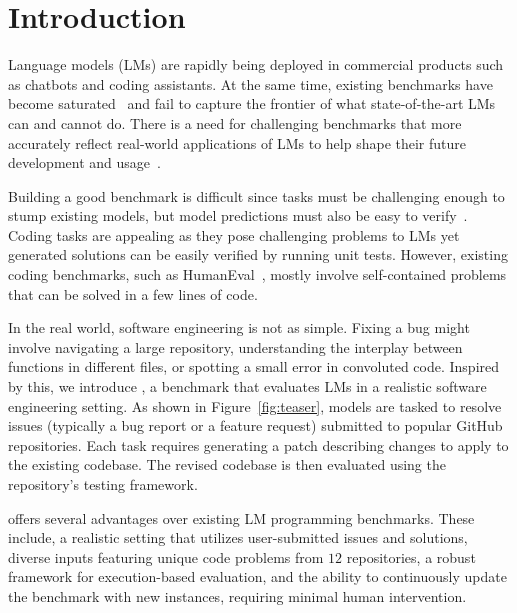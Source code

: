 \vspace{-1em}  %
\section{Introduction}
\label{section:introduction}

Language models (LMs) are rapidly being deployed in commercial products such as chatbots and coding assistants.
At the same time, existing benchmarks have become saturated~\citep{kiela2021dynabench, Ott2022MappingGD} and fail to capture the frontier of what state-of-the-art LMs can and cannot do. 
There is a need for challenging benchmarks that more accurately reflect real-world applications of LMs to help shape their future development and usage~\citep{srivastava2023imitation}.



Building a good benchmark is difficult since tasks must be challenging enough to stump existing models, but model predictions must also be easy to verify~\citep{MartnezPlumed2021ResearchCD}.
Coding tasks are appealing as they pose challenging problems to LMs yet generated solutions can be easily verified by running unit tests.
However, existing coding benchmarks, such as HumanEval~\citep{chen2021evaluating}, mostly involve self-contained problems that can be solved in a few lines of code.

In the real world, software engineering is not as simple.
Fixing a bug might involve navigating a large repository, understanding the interplay between functions in different files, or spotting a small error in convoluted code.
Inspired by this, we introduce \benchmark{}, a benchmark that evaluates LMs in a realistic software engineering setting.
As shown in Figure~\ref{fig:teaser}, models are tasked to resolve issues (typically a bug report or a feature request) submitted to popular GitHub repositories.
Each task requires generating a patch describing changes to apply to the existing codebase.
The revised codebase is then evaluated using the repository's testing framework.

\benchmark{} offers several advantages over existing LM programming benchmarks.
These include, a realistic setting that utilizes user-submitted issues and solutions, diverse inputs featuring unique code problems from $12$ repositories, a robust framework for execution-based evaluation, and the ability to continuously update the benchmark with new instances, requiring minimal human intervention.

